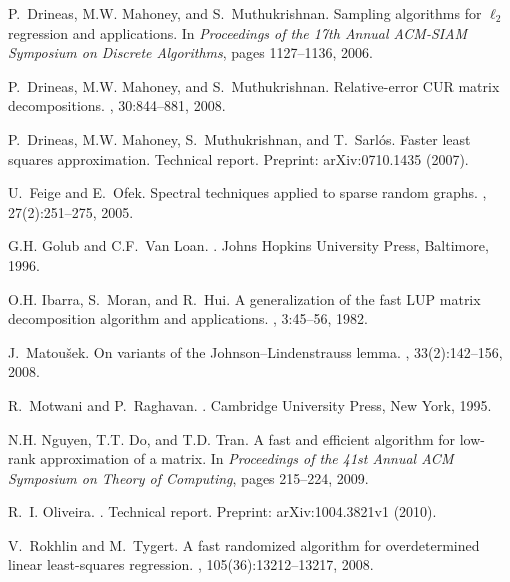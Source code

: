 \documentclass[11pt]{article}
\begin{document}
\begin{thebibliography}{10}
P.~Drineas, M.W. Mahoney, and S.~Muthukrishnan.
\newblock Sampling algorithms for $\ell_2$ regression and applications.
\newblock In {\em Proceedings of the 17th Annual ACM-SIAM Symposium on Discrete
  Algorithms}, pages 1127--1136, 2006.

P.~Drineas, M.W. Mahoney, and S.~Muthukrishnan.
\newblock Relative-error {CUR} matrix decompositions.
, 30:844--881,
  2008.

P.~Drineas, M.W. Mahoney, S.~Muthukrishnan, and T.~Sarl\'{o}s.
\newblock Faster least squares approximation.
\newblock Technical report.
\newblock Preprint: arXiv:0710.1435 (2007).

U.~Feige and E.~Ofek.
\newblock Spectral techniques applied to sparse random graphs.
, 27(2):251--275, 2005.

G.H. Golub and C.F.~Van Loan.
.
\newblock Johns Hopkins University Press, Baltimore, 1996.

O.H. Ibarra, S.~Moran, and R.~Hui.
\newblock A generalization of the fast {LUP} matrix decomposition algorithm and
  applications.
, 3:45--56, 1982.

J.~Matou\v{s}ek.
\newblock On variants of the {J}ohnson--{L}indenstrauss lemma.
, 33(2):142--156, 2008.

R.~Motwani and P.~Raghavan.
.
\newblock Cambridge University Press, New York, 1995.

N.H. Nguyen, T.T. Do, and T.D. Tran.
\newblock A fast and efficient algorithm for low-rank approximation of a
  matrix.
\newblock In {\em Proceedings of the 41st Annual ACM Symposium on Theory of
  Computing}, pages 215--224, 2009.

R.~I. Oliveira.
.
\newblock Technical report.
\newblock Preprint: arXiv:1004.3821v1 (2010).

V.~Rokhlin and M.~Tygert.
\newblock A fast randomized algorithm for overdetermined linear least-squares
  regression.
, 105(36):13212--13217, 2008.


\end{thebibliography}
\end{document}
